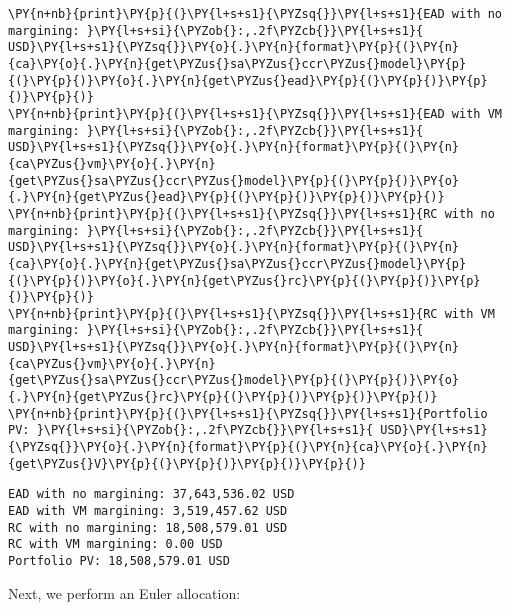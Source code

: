     \begin{tcolorbox}[breakable, size=fbox, boxrule=1pt, pad at break*=1mm,colback=cellbackground, colframe=cellborder]
\begin{Verbatim}[commandchars=\\\{\}]
\PY{n+nb}{print}\PY{p}{(}\PY{l+s+s1}{\PYZsq{}}\PY{l+s+s1}{EAD with no margining: }\PY{l+s+si}{\PYZob{}:,.2f\PYZcb{}}\PY{l+s+s1}{ USD}\PY{l+s+s1}{\PYZsq{}}\PY{o}{.}\PY{n}{format}\PY{p}{(}\PY{n}{ca}\PY{o}{.}\PY{n}{get\PYZus{}sa\PYZus{}ccr\PYZus{}model}\PY{p}{(}\PY{p}{)}\PY{o}{.}\PY{n}{get\PYZus{}ead}\PY{p}{(}\PY{p}{)}\PY{p}{)}\PY{p}{)}
\PY{n+nb}{print}\PY{p}{(}\PY{l+s+s1}{\PYZsq{}}\PY{l+s+s1}{EAD with VM margining: }\PY{l+s+si}{\PYZob{}:,.2f\PYZcb{}}\PY{l+s+s1}{ USD}\PY{l+s+s1}{\PYZsq{}}\PY{o}{.}\PY{n}{format}\PY{p}{(}\PY{n}{ca\PYZus{}vm}\PY{o}{.}\PY{n}{get\PYZus{}sa\PYZus{}ccr\PYZus{}model}\PY{p}{(}\PY{p}{)}\PY{o}{.}\PY{n}{get\PYZus{}ead}\PY{p}{(}\PY{p}{)}\PY{p}{)}\PY{p}{)}
\PY{n+nb}{print}\PY{p}{(}\PY{l+s+s1}{\PYZsq{}}\PY{l+s+s1}{RC with no margining: }\PY{l+s+si}{\PYZob{}:,.2f\PYZcb{}}\PY{l+s+s1}{ USD}\PY{l+s+s1}{\PYZsq{}}\PY{o}{.}\PY{n}{format}\PY{p}{(}\PY{n}{ca}\PY{o}{.}\PY{n}{get\PYZus{}sa\PYZus{}ccr\PYZus{}model}\PY{p}{(}\PY{p}{)}\PY{o}{.}\PY{n}{get\PYZus{}rc}\PY{p}{(}\PY{p}{)}\PY{p}{)}\PY{p}{)}
\PY{n+nb}{print}\PY{p}{(}\PY{l+s+s1}{\PYZsq{}}\PY{l+s+s1}{RC with VM margining: }\PY{l+s+si}{\PYZob{}:,.2f\PYZcb{}}\PY{l+s+s1}{ USD}\PY{l+s+s1}{\PYZsq{}}\PY{o}{.}\PY{n}{format}\PY{p}{(}\PY{n}{ca\PYZus{}vm}\PY{o}{.}\PY{n}{get\PYZus{}sa\PYZus{}ccr\PYZus{}model}\PY{p}{(}\PY{p}{)}\PY{o}{.}\PY{n}{get\PYZus{}rc}\PY{p}{(}\PY{p}{)}\PY{p}{)}\PY{p}{)}
\PY{n+nb}{print}\PY{p}{(}\PY{l+s+s1}{\PYZsq{}}\PY{l+s+s1}{Portfolio PV: }\PY{l+s+si}{\PYZob{}:,.2f\PYZcb{}}\PY{l+s+s1}{ USD}\PY{l+s+s1}{\PYZsq{}}\PY{o}{.}\PY{n}{format}\PY{p}{(}\PY{n}{ca}\PY{o}{.}\PY{n}{get\PYZus{}V}\PY{p}{(}\PY{p}{)}\PY{p}{)}\PY{p}{)}
\end{Verbatim}
\end{tcolorbox}

    \begin{Verbatim}[commandchars=\\\{\}]
EAD with no margining: 37,643,536.02 USD
EAD with VM margining: 3,519,457.62 USD
RC with no margining: 18,508,579.01 USD
RC with VM margining: 0.00 USD
Portfolio PV: 18,508,579.01 USD
    \end{Verbatim}

    Next, we perform an Euler allocation:

